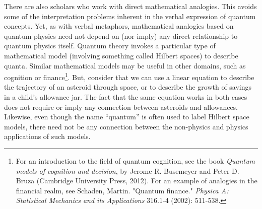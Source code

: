 \documentclass[12pt,onecolumn,preprintnumbers,amsmath,amssymbn,reprint,nofootinbib,superscriptaddress]{revtex4}    %
\begin{document}
There are also scholars who work with direct mathematical analogies.  This avoids some of the interpretation problems inherent in the verbal expression of quantum concepts. Yet, as with verbal metaphors, mathematical analogies based on quantum physics need not depend on (nor imply) any direct relationship to quantum physics itself. Quantum theory invokes a particular type of mathematical model (involving something called Hilbert spaces) to describe quanta. Similar mathematical models may be useful in other domains, such as cognition or finance\footnote{For an introduction to the field of quantum cognition, see the book   {\em{Quantum models of cognition and decision}}, by Jerome R. Busemeyer and Peter D. Bruza (Cambridge University Press, 2012).  For an example of analogies in the financial realm, see Schaden, Martin. "Quantum finance." {\em{Physica A: Statistical Mechanics and its Applications}} 316.1-4 (2002): 511-538.}.  But, consider that we can use a linear equation to describe the trajectory of an asteroid through space, or to describe the growth of savings in a child's allowance jar.  The fact that the same equation works in both cases does not require or imply any connection between asteroids and allowances.  Likewise, even though the name ``quantum'' is often used to label Hilbert space models, there need not be any connection between the non-physics and physics applications of such models.


 
\end{document}
